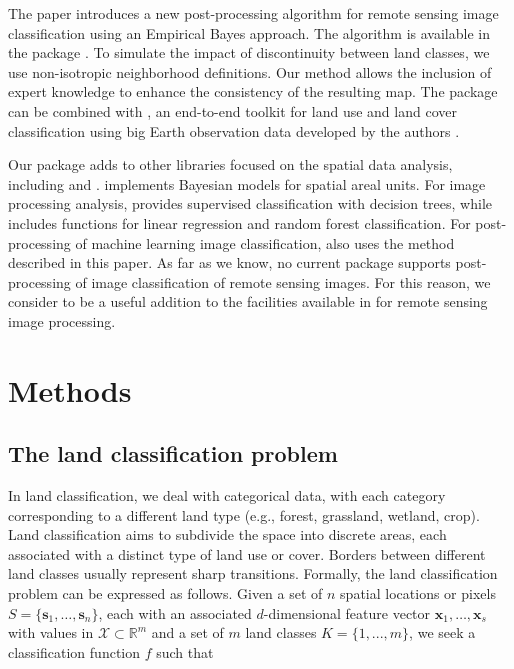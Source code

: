 \documentclass[
  shortnames]{jss}
\begin{document}
The paper introduces a new post-processing algorithm for remote sensing image classification using an Empirical Bayes approach. The algorithm is available in the  package . To simulate the impact of discontinuity between land classes, we use non-isotropic neighborhood definitions. Our method allows the inclusion of expert knowledge to enhance the consistency of the resulting map. The  package can be combined with , an end-to-end toolkit for land use and land cover classification using big Earth observation data developed by the authors \citep{Simoes2021}.

Our package adds to other  libraries focused on the spatial data analysis, including  \citep{Bivand2023} and  \citep{Li2022}.  \citep{Lee2013} implements Bayesian models for spatial areal units. For image processing analysis,  \citep{Hijmans2023} provides supervised classification with decision trees, while  \citep{Bivand2023} includes functions for linear regression and random forest classification. For post-processing of machine learning image classification,  also uses the method described in this paper. As far as we know, no current  package supports post-processing of image classification of remote sensing images. For this reason, we consider  to be a useful addition to the facilities available in  for remote sensing image processing.

\newpage

\section{Methods}\label{methods}

\subsection{The land classification problem}\label{the-land-classification-problem}

In land classification, we deal with categorical data, with each category corresponding to a different land type (e.g., forest, grassland, wetland, crop). Land classification aims to subdivide the space into discrete areas, each associated with a distinct type of land use or cover. Borders between different land classes usually represent sharp transitions. Formally, the land classification problem can be expressed as follows. Given a set of \(n\) spatial locations or pixels \(S = \{ \mathbf{s}_1, \ldots, \mathbf{s}_n \}\), each with an associated \(d\)-dimensional feature vector \(\mathbf{x}_1, \ldots, \mathbf{x}_s\) with values in \(\mathcal{X} \subset \mathbb{R}^m\) and a set of \(m\) land classes \(K = \{ 1, ..., m \}\), we seek a classification function \(f\) such that
\end{document}
